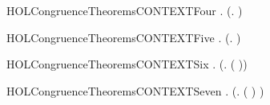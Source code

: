 \begin{SaveVerbatim}{HOLCongruenceTheoremsCONTEXTFour}
\HOLTokenTurnstile{} \HOLSymConst{\HOLTokenForall{}} .   \HOLSymConst{\HOLTokenConj{}}   \HOLSymConst{\HOLTokenImp{}}  (\HOLTokenLambda{}.   \HOLSymConst{\ensuremath{+}}  )
\end{SaveVerbatim}
\newcommand{\HOLCongruenceTheoremsCONTEXTFour}{\UseVerbatim{HOLCongruenceTheoremsCONTEXTFour}}
\begin{SaveVerbatim}{HOLCongruenceTheoremsCONTEXTFive}
\HOLTokenTurnstile{} \HOLSymConst{\HOLTokenForall{}} .   \HOLSymConst{\HOLTokenConj{}}   \HOLSymConst{\HOLTokenImp{}}  (\HOLTokenLambda{}.   \HOLSymConst{\ensuremath{\parallel}}  )
\end{SaveVerbatim}
\newcommand{\HOLCongruenceTheoremsCONTEXTFive}{\UseVerbatim{HOLCongruenceTheoremsCONTEXTFive}}
\begin{SaveVerbatim}{HOLCongruenceTheoremsCONTEXTSix}
\HOLTokenTurnstile{} \HOLSymConst{\HOLTokenForall{}} .   \HOLSymConst{\HOLTokenImp{}}  (\HOLTokenLambda{}. \HOLConst{\ensuremath{\nu}}  ( ))
\end{SaveVerbatim}
\newcommand{\HOLCongruenceTheoremsCONTEXTSix}{\UseVerbatim{HOLCongruenceTheoremsCONTEXTSix}}
\begin{SaveVerbatim}{HOLCongruenceTheoremsCONTEXTSeven}
\HOLTokenTurnstile{} \HOLSymConst{\HOLTokenForall{}} .   \HOLSymConst{\HOLTokenImp{}}  (\HOLTokenLambda{}.  ( ) )
\end{SaveVerbatim}
\newcommand{\HOLCongruenceTheoremsCONTEXTSeven}{\UseVerbatim{HOLCongruenceTheoremsCONTEXTSeven}}
